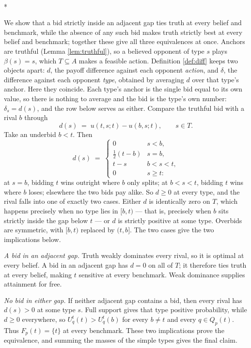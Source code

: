 \documentclass[12pt]{article}
\makeatletter
\theoremstyle{definition}
\renewenvironment{proof}[1][\proofname]{\par
  \pushQED{\qed}%
  \normalfont \topsep6\p@\@plus6\p@\relax
  \trivlist
  \item[\hskip\labelsep\itshape #1\@addpunct{.}]\mbox{}\\*
  \ignorespaces
}{%
  \popQED\endtrivlist\@endpefalse
}
\makeatother
\begin{document}
\begin{proof}[Proof of Corollary \ref{th:gaps}]
We show that a bid strictly inside an adjacent gap ties truth at every belief and benchmark, while the absence of any such bid makes truth strictly best at every belief and benchmark; together these give all three equivalences at once. Anchors are truthful (Lemma \ref{lem:truthful}), so a believed opponent of type $s$ plays $\beta(s) = s$, which $T \subseteq A$ makes a feasible action. Definition \ref{def:diff} keeps two objects apart: $d$, the payoff difference against each opponent \emph{action}, and $\delta$, the difference against each opponent \emph{type}, obtained by averaging $d$ over that type's anchor. Here they coincide. Each type's anchor is the single bid equal to its own value, so there is nothing to average and the bid is the type's own number: $\delta_s = d(s)$, and the row below serves as either. Compare the truthful bid with a rival $b$ through
\[
d(s) \;=\; u(t, s; t) - u(b, s; t), \qquad s \in T.
\]
Take an underbid $b < t$. Then
\[
d(s) \;=\;
\begin{cases}
0 & s < b, \\
\tfrac12 (t - b) & s = b, \\
t - s & b < s < t, \\
0 & s \ge t :
\end{cases}
\]
at $s = b$, bidding $t$ wins outright where $b$ only splits; at $b < s < t$, bidding $t$ wins where $b$ loses; elsewhere the two bids pay alike. So $d \ge 0$ at every type, and the rival falls into one of exactly two cases. Either $d$ is identically zero on $T$, which happens precisely when no type lies in $[b, t)$ --- that is, precisely when $b$ sits strictly inside the gap below $t$ --- or $d$ is strictly positive at some type. Overbids are symmetric, with $[b, t)$ replaced by $(t, b]$. The two cases give the two implications below.

\emph{A bid in an adjacent gap.} Truth weakly dominates every rival, so it is optimal at every belief. A bid in an adjacent gap has $d = 0$ on all of $T$; it therefore ties truth at every belief, making $t$ sensitive at every benchmark. Weak dominance supplies attainment for free.

\emph{No bid in either gap.} If neither adjacent gap contains a bid, then every rival has $d(s) > 0$ at some type $s$. Full support gives that type positive probability, while $d \ge 0$ everywhere, so $U^t_q(t) > U^t_q(b)$ for every $b \neq t$ and every $q \in Q_p(t)$. Thus $F_p(t) = \{t\}$ at every benchmark. These two implications prove the equivalence, and summing the masses of the simple types gives the final claim.
\end{proof}
\end{document}
